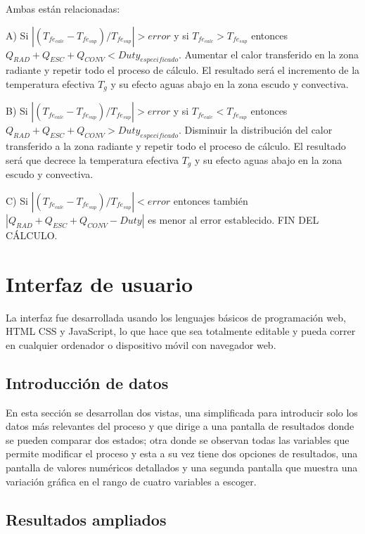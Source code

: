 \par Ambas están relacionadas:
\par A) Si $|(T_{fe_{calc}} - T_{fe_{sup}}) /T_{fe_{sup}} | > error$ y si $T_{fe_{calc}} > T_{fe_{sup}}$ entonces $Q_{RAD} + Q_{ESC} + Q_{CONV} < Duty_{especificado}$. Aumentar el calor transferido en la zona radiante y repetir todo el proceso de cálculo. El resultado será el incremento de la temperatura efectiva $T_{g}$ y su efecto aguas abajo en la zona escudo y convectiva. 
\par B) Si $|(T_{fe_{calc}} - T_{fe_{sup}}) /T_{fe_{sup}} | > error$ y si $T_{fe_{calc}} < T_{fe_{sup}}$ entonces $Q_{RAD} + Q_{ESC} + Q_{CONV} > Duty_{especificado}$. Disminuir la distribución del calor transferido a la zona radiante y repetir todo el proceso de cálculo. El resultado será que decrece la temperatura efectiva $T_{g}$ y su efecto aguas abajo en la zona escudo y convectiva. 
\par C) Si $|(T_{fe_{calc}} - T_{fe_{sup}}) /T_{fe_{sup}} | < error$ entonces también $|Q_{RAD} + Q_{ESC} + Q_{CONV} - Duty|$ es menor al error establecido. FIN DEL CÁLCULO.

\section{Interfaz de usuario}

\par La interfaz fue desarrollada usando los lenguajes básicos de programación web, HTML CSS y JavaScript, lo que hace que sea totalmente editable y pueda correr en cualquier ordenador o dispositivo móvil con navegador web.

\subsection{Introducción de datos}

\par En esta sección se desarrollan dos vistas, una simplificada para introducir solo los datos más relevantes del proceso y que dirige a una pantalla de resultados donde se pueden comparar dos estados; otra donde se observan todas las variables que permite modificar el proceso y esta a su vez tiene dos opciones de resultados, una pantalla de valores numéricos detallados y una segunda pantalla que muestra una variación gráfica en el rango de cuatro variables a escoger.  

\subsection{Resultados ampliados}

